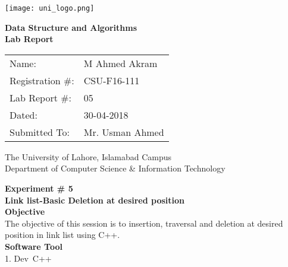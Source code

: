 \documentclass[11pt]{article}            %
\begin{document}
\begin{titlepage}
    \centering
  \vfill
    \texttt{[image: uni\_logo.png]} \\ 
	\vskip2cm
    {\bfseries\Large
	Data Structure and Algorithms \\ 
	
	\vskip2cm
	Lab Report 
	 
	\vskip2cm
	}    

\begin{center}
\begin{tabular}{ l l  } 

Name: & M Ahmed Akram \\ 
Registration \#: & CSU-F16-111 \\ 
Lab Report \#: & 05 \\ 
 Dated:& 30-04-2018\\ 
Submitted To:& Mr. Usman Ahmed\\ 

\end{tabular}
\end{center}
    \vfill
    The University of Lahore, Islamabad Campus\\
Department of Computer Science \& Information Technology
\end{titlepage}


    
    {\bfseries\Large
\centering
	Experiment \# 5 \\

Link list-Basic Deletion at desired position  \\
	
	}    
 \vskip1cm
 \textbf {Objective}\\ 
The objective of this session is to insertion, traversal and deletion at desired position in link list
using C++.\\

\textbf {Software Tool} \\
1.   Dev\ C++
\end{document}

